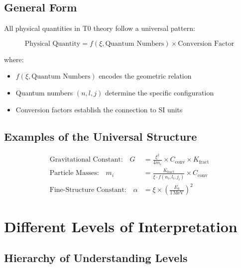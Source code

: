 	\subsection{General Form}
	
	All physical quantities in T0 theory follow a universal pattern:
	
	\begin{equation}
		\boxed{\text{Physical Quantity} = f(\xi, \text{Quantum Numbers}) \times \text{Conversion Factor}}
		\label{eq:universal_pattern}
	\end{equation}
	
	where:
	\begin{itemize}
		\item $f(\xi, \text{Quantum Numbers})$ encodes the geometric relation
		\item Quantum numbers $(n,l,j)$ determine the specific configuration
		\item Conversion factors establish the connection to SI units
	\end{itemize}
	
	\subsection{Examples of the Universal Structure}
	
	\begin{align}
		\text{Gravitational Constant:} \quad G &= \frac{\xi^2}{4m_e} \times C_{\text{conv}} \times K_{\text{fract}} \\
		\text{Particle Masses:} \quad m_i &= \frac{K_{\text{fract}}}{\xi \cdot f(n_i,l_i,j_i)} \times C_{\text{conv}} \\
		\text{Fine-Structure Constant:} \quad \alpha &= \xi \times \left(\frac{E_0}{1\,\mathrm{MeV}}\right)^2
	\end{align}
	
	\section{Different Levels of Interpretation}
	
	\subsection{Hierarchy of Understanding Levels}
	
